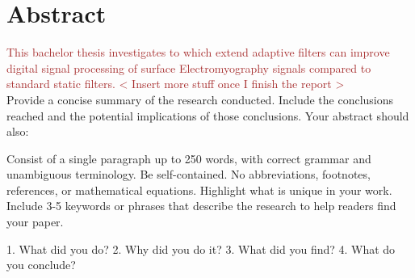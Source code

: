 \chapter*{Abstract}
\textcolor{brown}{
This bachelor thesis investigates to which extend adaptive filters can improve digital signal processing of surface Electromyography signals compared to standard static filters. < Insert more stuff once I finish the report > } \\

Provide a concise summary of the research conducted. Include the conclusions reached and the potential implications of those conclusions. Your abstract should also:

Consist of a single paragraph up to 250 words, with correct grammar and unambiguous terminology.
Be self-contained. No abbreviations, footnotes, references, or mathematical equations.
Highlight what is unique in your work.
Include 3-5 keywords or phrases that describe the research to help readers find your paper.

1. What did you do?
2. Why did you do it?
3. What did you find?
4. What do you conclude?